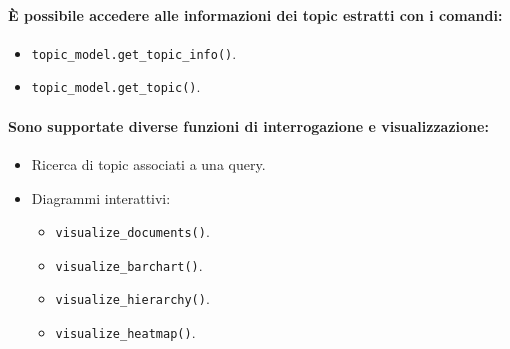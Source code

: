 \paragraph{È possibile accedere alle informazioni dei topic estratti con i comandi:}

\begin{itemize}
  \item \texttt{topic\_model.get\_topic\_info()}. 
  \item \texttt{topic\_model.get\_topic()}.
\end{itemize}

\paragraph{Sono supportate diverse funzioni di interrogazione e visualizzazione:}

\begin{itemize}
  \item Ricerca di topic associati a una query. 
  \item Diagrammi interattivi: 
    \begin{itemize}
      \item \texttt{visualize\_documents()}. 
      \item \texttt{visualize\_barchart()}. 
      \item \texttt{visualize\_hierarchy()}. 
      \item \texttt{visualize\_heatmap()}.
    \end{itemize}
\end{itemize}












